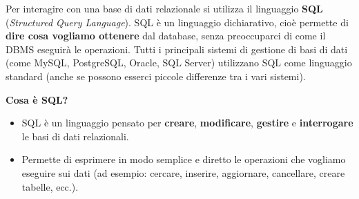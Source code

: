 \documentclass[a4paper,12pt]{article}
\begin{document}
Per interagire con una base di dati relazionale si utilizza il linguaggio \textbf{SQL} (\textit{Structured Query Language}).  
SQL è un linguaggio dichiarativo, cioè permette di \textbf{dire cosa vogliamo ottenere} dal database, senza preoccuparci di come il DBMS eseguirà le operazioni.  
Tutti i principali sistemi di gestione di basi di dati (come MySQL, PostgreSQL, Oracle, SQL Server) utilizzano SQL come linguaggio standard (anche se possono esserci piccole differenze tra i vari sistemi).

\medskip
\textbf{Cosa è SQL?}
\begin{itemize}
    \item SQL è un linguaggio pensato per \textbf{creare}, \textbf{modificare}, \textbf{gestire} e \textbf{interrogare} le basi di dati relazionali.
    \item Permette di esprimere in modo semplice e diretto le operazioni che vogliamo eseguire sui dati (ad esempio: cercare, inserire, aggiornare, cancellare, creare tabelle, ecc.).
\end{itemize}
\end{document}

